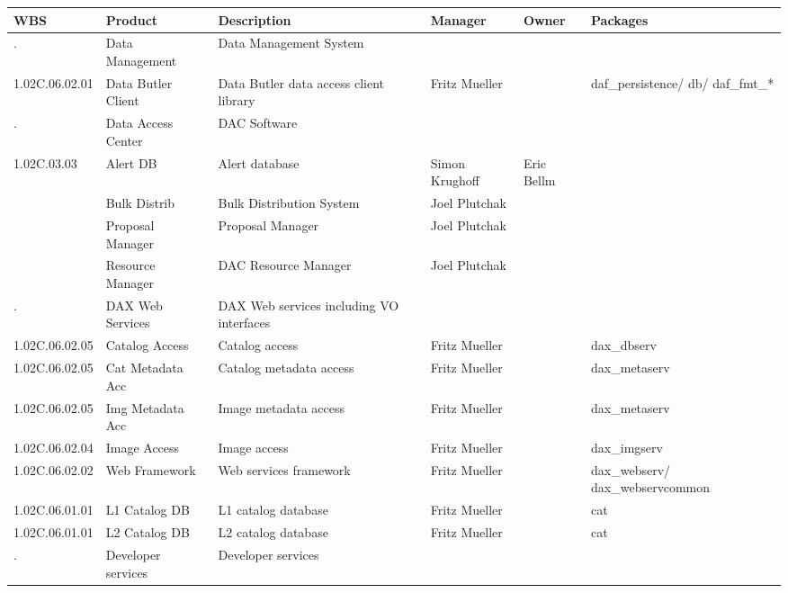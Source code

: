 \tiny 
\begin{longtable}{|p{}|p{}|p{}|p{}|p{}|p{}|}\hline 
 \bf WBS & Product & Description & Manager & Owner & Packages\\ \hline   
. &  Data Management & Data Management System &  &  & \\ \hline 
1.02C.06.02.01 &  Data Butler Client & Data Butler data access client library & Fritz Mueller &  & daf\_persistence/ db/ daf\_fmt\_*\\ \hline 
. &  Data Access Center & DAC Software &  &  & \\ \hline 
1.02C.03.03 &  Alert DB & Alert database & Simon Krughoff & Eric Bellm & \\ \hline 
 &  Bulk Distrib & Bulk Distribution System & Joel Plutchak &  & \\ \hline 
 &  Proposal Manager & Proposal Manager & Joel Plutchak &  & \\ \hline 
 &  Resource Manager & DAC Resource Manager & Joel Plutchak &  & \\ \hline 
. &  DAX Web Services & DAX Web services including VO interfaces &  &  & \\ \hline 
1.02C.06.02.05 &  Catalog Access & Catalog access & Fritz Mueller &  & dax\_dbserv\\ \hline 
1.02C.06.02.05 &  Cat Metadata Acc & Catalog metadata access & Fritz Mueller &  & dax\_metaserv\\ \hline 
1.02C.06.02.05 &  Img Metadata Acc & Image metadata access & Fritz Mueller &  & dax\_metaserv\\ \hline 
1.02C.06.02.04 &  Image Access & Image access & Fritz Mueller &  & dax\_imgserv\\ \hline 
1.02C.06.02.02 &  Web Framework & Web services framework & Fritz Mueller &  & dax\_webserv/ dax\_webservcommon\\ \hline 
1.02C.06.01.01 &  L1 Catalog DB & L1 catalog database & Fritz Mueller &  & cat\\ \hline 
1.02C.06.01.01 &  L2 Catalog DB & L2 catalog database & Fritz Mueller &  & cat\\ \hline 
. &  Developer services & Developer services &  &  & \\ \hline 

\end{longtable}
